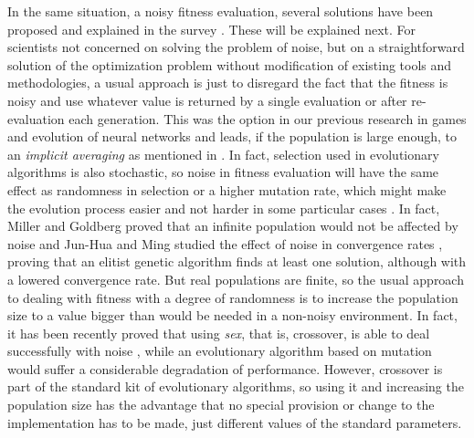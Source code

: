 \documentclass{llncs}
\begin{document}
\sloppypar In the same situation, a noisy fitness evaluation, several solutions have been
proposed and explained in the survey \cite{Jin2005303}. These will be
explained next.
For scientists not concerned on solving the problem of noise, but on
a straightforward solution of the optimization problem without
modification of existing tools and methodologies, a usual approach is
just to disregard the fact that the fitness is 
noisy and use whatever value is returned by a single evaluation or after
re-evaluation each generation. 
This was the option in our
previous research in games \cite{bots:evostar,DBLP:journals/jcst/MoraFGGF12,Liberatore_COSECIVI14} and evolution of neural networks \cite{castilloGECCO99,merelo:ESNN} and leads, if
the population is large enough, to an {\em implicit averaging} as
mentioned in \cite{Jin2005303}. In fact, selection used in evolutionary algorithms
is also stochastic, so noise in fitness evaluation
will have the same effect as randomness in selection or a higher mutation
rate, which might make the evolution process easier and not harder
in some particular cases
\cite{DBLP:journals/corr/QianYZ13}. 
In fact, Miller and Goldberg proved that an infinite population would not
be affected by noise \cite{miller1996genetic} and Jun-Hua and Ming studied the
effect of noise in convergence rates \cite{Junhua20136780}, proving
that an elitist genetic algorithm finds at least one solution, although with a lowered
convergence rate. But real populations are finite, so the usual
approach to dealing with fitness with a degree of randomness is to
increase the population size to a value bigger than 
would be needed in a non-noisy environment. In fact, it has been
recently proved that using {\em sex}, that is, crossover, is able to
deal successfully with noise \cite{2015arXiv150202793F}, while an
evolutionary algorithm based on mutation
would suffer a considerable degradation of performance. 
However, crossover is part of the standard kit of evolutionary
algorithms, so using it and increasing the population size has the
advantage that no special provision or change to the implementation
has to be made, just different values of the standard parameters.
\end{document}
